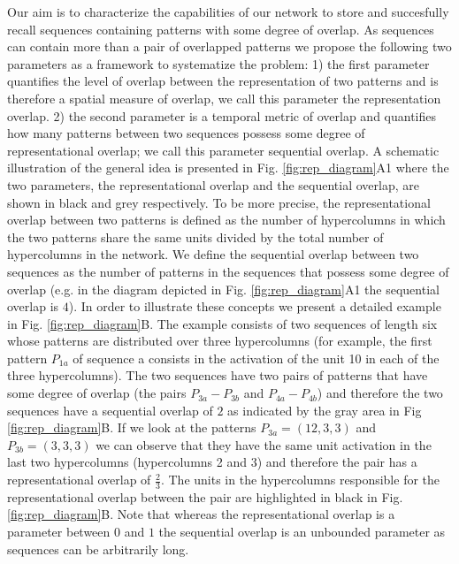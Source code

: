\documentclass[10pt,a4paper]{article}
\begin{document}
Our aim is to characterize the capabilities of our network to store and succesfully recall sequences containing patterns with some degree of overlap. As sequences can contain more than a pair of overlapped patterns we propose the following two parameters as a framework to systematize the problem: 1) the first parameter quantifies the level of overlap between the representation of two patterns and is therefore a spatial measure of overlap, we call this parameter the representation overlap. 2) the second parameter is a temporal metric of overlap and quantifies how many patterns between two sequences possess some degree of representational overlap; we call this parameter sequential overlap. A schematic illustration of the general idea is presented in Fig. \ref{fig:rep_diagram}A1 where the two parameters, the representational overlap and the sequential overlap, are shown in black and grey respectively. To be more precise, the representational overlap between two patterns is defined as the number of hypercolumns in which the two patterns share the same units divided by the total number of hypercolumns in the network. We define the sequential overlap between two sequences as the number of patterns in the sequences that possess some degree of overlap (e.g. in the diagram depicted in Fig. \ref{fig:rep_diagram}A1 the sequential overlap is $4$). In order to illustrate these concepts we present a detailed example in Fig. \ref{fig:rep_diagram}B. The example consists of two sequences of length six whose patterns are distributed over three hypercolumns (for example, the first pattern $P_{1a}$ of sequence a consists in the activation of the unit 10 in each of the three hypercolumns). The two sequences have two pairs of patterns that have some degree of overlap (the pairs $P_{3a}-P_{3b}$ and $P_{4a}-P_{4b}$) and therefore the two sequences have a sequential overlap of $2$ as indicated by the gray area in Fig \ref{fig:rep_diagram}B. If we look at the patterns $P_{3a}=(12, 3, 3)$ and $P_{3b}=(3, 3, 3)$ we can observe that they have the same unit activation in the last two hypercolumns (hypercolumns 2 and 3) and therefore the pair has a representational overlap of $\frac{2}{3}$. The units in the hypercolumns responsible for the representational overlap between the pair are highlighted in black in Fig. \ref{fig:rep_diagram}B. Note that whereas the representational overlap is a parameter between $0$ and $1$ the sequential overlap is an unbounded parameter as sequences can be arbitrarily long.
 
\end{document}
